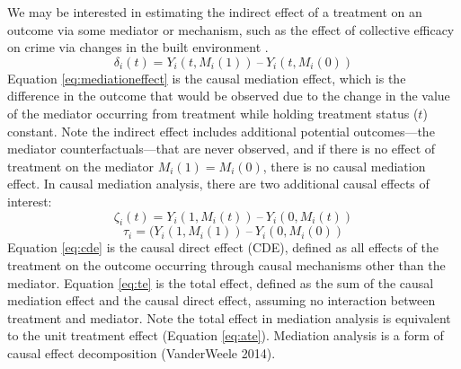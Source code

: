 \documentclass [11pt, proquest] {uwthesis}[2015/03/03]
\begin{document}
We may be interested in estimating the indirect effect of a treatment on an outcome via some mediator or mechanism, such as the effect of collective efficacy on crime via changes in the built environment .
\begin{equation}
\delta_i(t) = Y_i(t, M_i(1)) \:–\: Y_i(t, M_i(0))
\label{eq:mediationeffect}
\end{equation}
Equation \eqref{eq:mediationeffect} is the causal mediation effect, which is the difference in the outcome that would be observed due to the change in the value of the mediator occurring from treatment while holding treatment status (\(t\)) constant. Note the indirect effect includes additional potential outcomes---the mediator counterfactuals---that are never observed, and if there is no effect of treatment on the mediator \(M_i(1) = M_i(0)\), there is no causal mediation effect. In causal mediation analysis, there are two additional causal effects of interest:
\begin{equation}
\zeta_i(t) = Y_i(1, M_i(t)) \:–\: Y_i(0, M_i(t))
\label{eq:cde}
\end{equation}
\begin{equation}
\tau_i =  (Y_i(1, M_i(1)) \:–\: Y_i(0, M_i(0))
\label{eq:te}
\end{equation}
Equation \eqref{eq:cde} is the causal direct effect (CDE), defined as all effects of the treatment on the outcome occurring through causal mechanisms other than the mediator. Equation \eqref{eq:te} is the total effect, defined as the sum of the causal mediation effect and the causal direct effect, assuming no interaction between treatment and mediator. Note the total effect in mediation analysis is equivalent to the unit treatment effect (Equation \eqref{eq:ate}). Mediation analysis is a form of causal effect decomposition (VanderWeele 2014).
\end{document}

